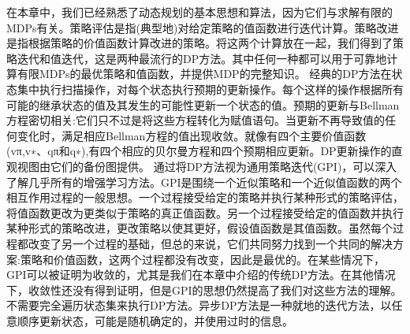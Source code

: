 在本章中，我们已经熟悉了动态规划的基本思想和算法，因为它们与求解有限的MDPs有关。策略评估是指(典型地)对给定策略的值函数进行迭代计算。策略改进是指根据策略的价值函数计算改进的策略。将这两个计算放在一起，我们得到了策略迭代和值迭代，这是两种最流行的DP方法。其中任何一种都可以用于可靠地计算有限MDPs的最优策略和值函数，并提供MDP的完整知识。
经典的DP方法在状态集中执行扫描操作，对每个状态执行预期的更新操作。每个这样的操作根据所有可能的继承状态的值及其发生的可能性更新一个状态的值。预期的更新与Bellman方程密切相关:它们只不过是将这些方程转化为赋值语句。当更新不再导致值的任何变化时，满足相应Bellman方程的值出现收敛。就像有四个主要价值函数(vπ,v∗、qπ和q∗),有四个相应的贝尔曼方程和四个预期相应更新。DP更新操作的直观视图由它们的备份图提供。
通过将DP方法视为通用策略迭代(GPI)，可以深入了解几乎所有的增强学习方法。GPI是围绕一个近似策略和一个近似值函数的两个相互作用过程的一般思想。一个过程接受给定的策略并执行某种形式的策略评估，将值函数更改为更类似于策略的真正值函数。另一个过程接受给定的值函数并执行某种形式的策略改进，更改策略以使其更好，假设值函数是其值函数。虽然每个过程都改变了另一个过程的基础，但总的来说，它们共同努力找到一个共同的解决方案:策略和价值函数，这两个过程都没有改变，因此是最优的。在某些情况下，GPI可以被证明为收敛的，尤其是我们在本章中介绍的传统DP方法。在其他情况下，收敛性还没有得到证明，但是GPI的思想仍然提高了我们对这些方法的理解。
不需要完全遍历状态集来执行DP方法。异步DP方法是一种就地的迭代方法，以任意顺序更新状态，可能是随机确定的，并使用过时的信息。

